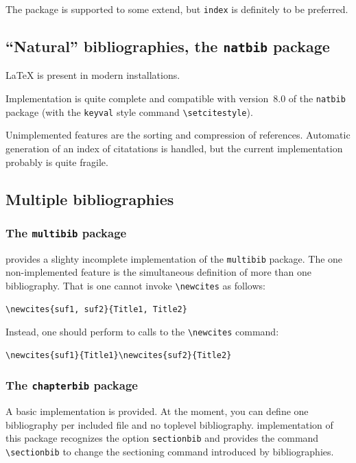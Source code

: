 The  package is
supported to some extend, but \texttt{index} is definitely to be
preferred.

\subsection{``Natural'' bibliographies, the \texttt{natbib} package }
\LaTeX{} 
is present in modern installations.

Implementation is quite complete and compatible
with version~8.0 of the \texttt{natbib} package
(with the \texttt{keyval} style command \verb+\setcitestyle+).

Unimplemented features are the sorting and compression of references.
Automatic generation of an index of citatations is handled, but
the current implementation probably is quite fragile.

\subsection{Multiple bibliographies}

\subsubsection*{The \texttt{multibib} package}
\hevea{} provides a slighty incomplete implementation of the
\texttt{multibib} package. The one non-implemented feature is the
simultaneous definition of more than one bibliography.
That is one cannot invoke \verb+\newcites+ as follows:
\begin{verbatim}
\newcites{suf1, suf2}{Title1, Title2}
\end{verbatim}
Instead, one should perform to calls to the \verb+\newcites+ command:
\begin{verbatim}
\newcites{suf1}{Title1}\newcites{suf2}{Title2}
\end{verbatim}


\subsubsection*{The \texttt{chapterbib} package}
A basic implementation is provided. At the moment, you can
define one bibliography per included file and no toplevel
bibliography.
\hevea{} implementation of this package recognizes the option
\verb+sectionbib+ and provides the command \verb+\sectionbib+
to change the sectioning command introduced by bibliographies.


